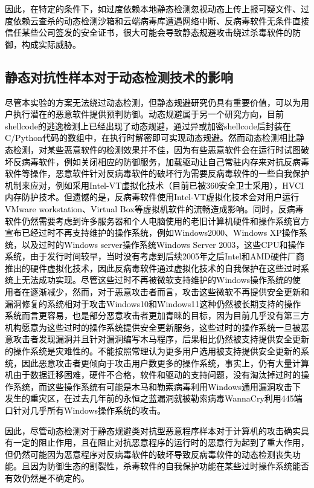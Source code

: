\textcolor{black}{因此，在特定的条件下，如过度依赖本地静态检测忽视动态上传上报可疑文件、过度依赖云查杀的动态检测沙箱和云端病毒库遭遇网络中断、反病毒软件无条件直接信任某些公司签发的安全证书，很大可能会导致静态规避攻击绕过杀毒软件的防御，构成实际威胁。}

\subsection{静态对抗性样本对于动态检测技术的影响}

\textcolor{black}{尽管本实验的方案无法绕过动态检测，但静态规避研究仍具有重要价值，可以为用户执行潜在的恶意软件提供预判防御。动态规避属于另一个研究方向，目前shellcode的逃逸检测上已经出现了动态规避，通过异或加密shellcode后封装在C/Python代码的数组中，在执行时解密即可实现动态规避。然而动态检测相比静态检测，对某些恶意软件的检测效果并不佳，因为有些恶意软件会在运行时试图破坏反病毒软件，例如关闭相应的防御服务，加载驱动让自己常驻内存来对抗反病毒软件等操作，恶意软件针对反病毒软件的破坏行为需要反病毒软件的一些自我保护机制来应对，例如采用Intel-VT虚拟化技术（目前已被360安全卫士采用），HVCI内存防护技术。但遗憾的是，反病毒软件使用Intel-VT虚拟化技术会对用户运行VMware workstation、Virtual Box等虚拟机软件的流畅造成影响。同时，反病毒软件仍然需要考虑到许多服务器和个人电脑使用的老旧计算机硬件和操作系统官方宣布已经过时不再支持维护的操作系统，例如Windows2000、Windows XP操作系统，以及过时的Windows server操作系统Windows Server 2003，这些CPU和操作系统，由于发行时间较早，当时没有考虑到后续2005年之后Intel和AMD硬件厂商推出的硬件虚拟化技术，因此反病毒软件通过虚拟化技术的自我保护在这些过时系统上无法成功实现。尽管这些过时不再被微软支持维护的Windows操作系统的使用者在逐渐减少，然而，对于恶意攻击者而言，攻击这些微软不再提供安全更新和漏洞修复的系统相对于攻击Windows10和Windows11这种仍然被长期支持的操作系统而言更容易，也是部分恶意攻击者更加青睐的目标，因为目前几乎没有第三方机构愿意为这些过时的操作系统提供安全更新服务，这些过时的操作系统一旦被恶意攻击者发现漏洞并且针对漏洞编写木马程序，后果相比仍然被支持提供安全更新的操作系统是灾难性的。不能按照常理认为更多用户选用被支持提供安全更新的系统，因此恶意攻击者更倾向于攻击用户数更多的操作系统，事实上，仍有大量计算机由于数据迁移困难，硬件不合格，软件和驱动的支持问题，没有淘汰掉过时的操作系统，而这些操作系统有可能是木马和勒索病毒利用Windows通用漏洞攻击下发生的重灾区，在过去几年前的永恒之蓝漏洞就被勒索病毒WannaCry利用445端口针对几乎所有Windows操作系统的攻击。}

\textcolor{black}{因此，尽管动态检测对于静态规避类对抗型恶意程序样本对于计算机的攻击确实具有一定的阻止作用，且在阻止对抗恶意程序的运行时的恶意行为起到了重大作用，但仍然可能因为恶意程序对反病毒软件的破坏导致反病毒软件的动态检测丧失功能。且因为防御生态的割裂性，杀毒软件的自我保护功能在某些过时操作系统能否有效仍然是不确定的。}

